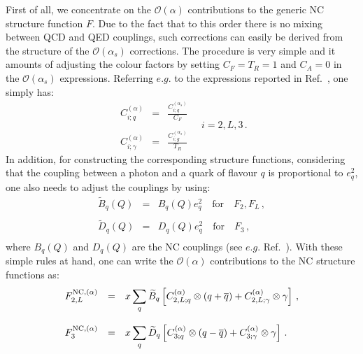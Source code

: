 First of all, we concentrate on the $\mathcal{O}(\alpha)$
contributions to the generic NC structure function $F$. Due to the
fact that to this order there is no mixing between QCD and QED
couplings, such corrections can easily be derived from the structure
of the $\mathcal{O}(\alpha_s)$ corrections. The procedure is very
simple and it amounts of adjusting the colour factors by setting
$C_F=T_R=1$ and $C_A=0$ in the $\mathcal{O}(\alpha_s)$
expressions. Referring $e.g.$ to the expressions reported in
Ref.~\cite{Ellis:1991qj}, one simply has:
\begin{equation}\label{eq:alphaCFs}
\begin{array}{rcl}
\displaystyle C_{i;q}^{(\alpha)} &=& \displaystyle \frac{C_{i;q}^{(\alpha_s)}}{C_F}\\
\\
\displaystyle C_{i;\gamma}^{(\alpha)} &=& \displaystyle \frac{C_{i;g}^{(\alpha_s)}}{T_R}
\end{array}\quad i = 2,L,3\,.
\end{equation}
In addition, for constructing the corresponding structure functions,
considering that the coupling between a photon and a quark of flavour
$q$ is proportional to $e_q^2$, one also needs to adjust the couplings
by using:
 \begin{equation}
\begin{array}{rcl}
\widetilde{B}_q(Q) &=& B_q(Q)e_q^2\quad\mbox{for}\quad F_2,F_L\,, \\
\\
\widetilde{D}_q(Q) &=& D_q(Q)e_q^2\quad\mbox{for}\quad F_3\,, \\
\end{array}
\end{equation}
where $B_q(Q)$ and $D_q(Q)$ are the NC couplings (see $e.g.$
Ref.~\cite{Adloff:2003uh}). With these simple rules at hand, one can
write the $\mathcal{O}(\alpha)$ contributions to the NC structure
functions as:
\begin{equation}
\begin{array}{rcl}
F_{2,L}^{{\rm NC},(\alpha)} &=& \displaystyle x \sum_{q} \widetilde{B}_q\left[C_{2,L;q}^{(\alpha)}\otimes
(q+\overline{q}) + C_{2,L;\gamma}^{(\alpha)} \otimes \gamma
                         \right]\,,\\
\\
F_3^{{\rm NC},(\alpha)} &=& \displaystyle x \sum_{q} \widetilde{D}_q\left[C_{3;q}^{(\alpha)}\otimes
(q-\overline{q}) + C_{3;\gamma}^{(\alpha)} \otimes \gamma
                         \right]\,.
\end{array}
\end{equation}

